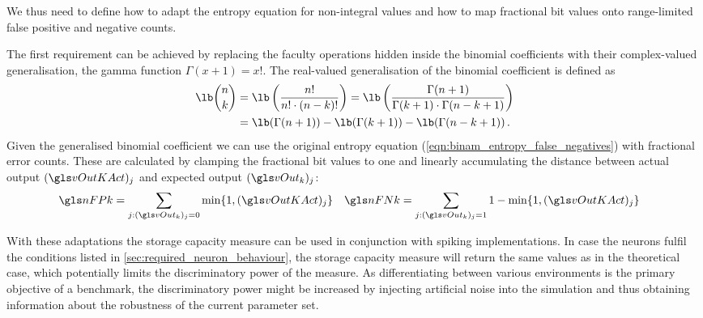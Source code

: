 We thus need to define how to adapt the entropy equation for non-integral values and how to map fractional bit values onto range-limited false positive and negative counts.

The first requirement can be achieved by replacing the faculty operations hidden inside the binomial coefficients with their complex-valued generalisation, the gamma function $\Gamma(x + 1) = x!$. The real-valued generalisation of the binomial coefficient is defined as
\begin{align}
	\lb\binom{n}{k}
		&= \lb\left(\frac{n!}{n! \cdot (n - k)!}\right)
		 = \lb\left(\frac{\Gamma(n + 1)}{\Gamma(k + 1) \cdot \Gamma(n - k + 1)}\right) \notag\\
		&= \lb(\Gamma(n + 1)) - \lb(\Gamma(k + 1)) - \lb(\Gamma(n - k + 1)) \,.
\end{align}
Given the generalised binomial coefficient we can use the original entropy equation (\ref{eqn:binam_entropy_false_negatives}) with fractional error counts. These are calculated by clamping the fractional bit values to one and linearly accumulating the distance between actual output \((\vOutKAct)_j\) and expected output \((\vOut_k)_j\):
\begin{align}
	\nFPk &= \sum_{j : (\vOut_k)_j = 0} \min \{1, (\vOutKAct)_j \}&
	\nFNk &= \sum_{j : (\vOut_k)_j = 1} 1 - \min \{1, (\vOutKAct)_j \}
\end{align}

With these adaptations the storage capacity measure can be used in conjunction with spiking \BiNAM implementations. In case the neurons fulfil the conditions listed in \cref{sec:required_neuron_behaviour}, the storage capacity measure will return the same values as in the theoretical case, which potentially limits the discriminatory power of the measure. As differentiating between various environments is the primary objective of a benchmark, the discriminatory power might be increased by injecting artificial noise into the simulation and thus obtaining information about the robustness of the current parameter set.

